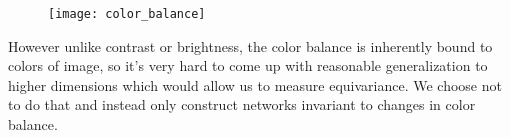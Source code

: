             \begin{figure}[h]
                \texttt{[image: color\_balance]}
                \label{fig:color_balance}
            \end{figure}
        However unlike contrast or brightness, the color balance is inherently
        bound to colors of image, so it's very hard to come up with reasonable
        generalization to higher dimensions which would allow us to measure
        equivariance. We choose not to do that and instead only construct
        networks invariant to changes in color balance.

